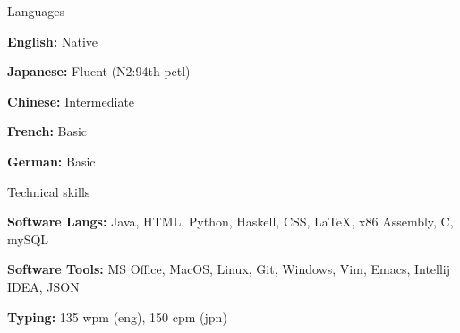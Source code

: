 \documentclass[10pt]{resume} %
\begin{document}
\begin{multicols}{3}


\begin{rSection}{Languages}
	\item \textbf{English:} Native
	\item \textbf{Japanese:} Fluent (N2:94th pctl)
	\item \textbf{Chinese:} Intermediate
	\item \textbf{French:} Basic
	\item \textbf{German:} Basic
\end{rSection}

\columnbreak

\begin{rSection}{Technical skills}
	\item \textbf{Software Langs:} 
    	Java, 
        HTML, 
        Python, 
        Haskell, 
        CSS, 
        \LaTeX, 
        x86 Assembly, 
        C, 
        mySQL
	\item \textbf{Software Tools:} 
    	MS Office, 
        MacOS, 
        Linux, 
        Git, 
        Windows, 
        Vim, 
        Emacs, 
        Intellij IDEA, 
        JSON
	\item \textbf{Typing:} 135 wpm (eng), 150 cpm (jpn)
\end{rSection}

\end{multicols}

\end{document}
